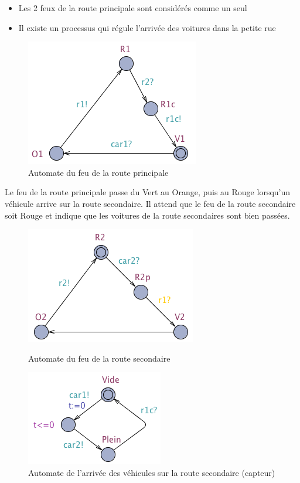 \documentclass[11pt]{article}
\begin{document}
\begin{itemize}
	\item Les 2 feux de la route principale sont considérés comme un seul
	\item Il existe un processus qui régule l'arrivée des voitures dans la petite rue
\end{itemize}

\begin{figure}[H]
	\centering
	\includegraphics[scale=0.5]{ressources/part3/Q9-1.png}
	\caption{Automate du feu de la route principale}
\end{figure}

Le feu de la route principale passe du Vert au Orange, puis au Rouge lorsqu'un véhicule arrive sur la route secondaire. Il attend que le feu de la route secondaire soit Rouge et indique que les voitures de la route secondaires sont bien passées.

\begin{figure}[h]
    \begin{minipage}[c]{.46\linewidth}
		\centering
		\includegraphics[scale=0.5]{ressources/part3/Q9-2.png}
		\caption{Automate du feu de la route secondaire}
    \end{minipage}
    \hfill%
    \begin{minipage}[c]{.46\linewidth}
		\centering
		\includegraphics[scale=0.5]{ressources/part3/Q9-3.png}
		\caption{Automate de l'arrivée des véhicules sur la route secondaire (capteur)}
    \end{minipage}
\end{figure}
\end{document}
